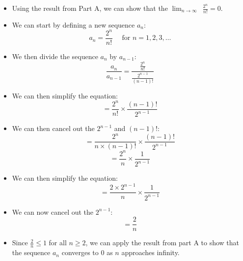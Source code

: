 \documentclass[12pt]{report}
\begin{document}
\begin{enumerate}[leftmargin=\labelsep]
\begin{enumerate}
\begin{tcolorbox}
\begin{itemize}[label={}]
                        \item Using the result from Part A, we can show that the $\displaystyle{\lim_{n \to \infty}}\,\,\, \frac{2^n}{n!}=0$.
                        \item We can start by defining a new sequence $a_n$:
                        \begin{equation*}
                            a_n = \frac{2^n}{n!} \quad \text{ for } n=1,2,3,\dots
                        \end{equation*}
                        \item We then divide the sequence $a_n$ by $a_{n-1}$:
                        \begin{equation*} \frac{a_n}{a_{n-1}} = \frac{\frac{2^n}{n!}}{\frac{2^{n-1}}{(n-1)!}}
                        \end{equation*}
                        \item We can then simplify the equation:
                        \begin{equation*}
                           = \frac{2^n}{n!} \times \frac{(n-1)!}{2^{n-1}}
                        \end{equation*}
                        \item We can then cancel out the $2^{n-1}$ and $(n-1)!$:
                        \begin{equation*}
                            = \frac{2^n}{n \times (n-1)!} \times \frac{(n-1)!}{2^{n-1}}
                        \end{equation*}
                        \begin{equation*}
                            =\frac{2^n}{n} \times \frac{1}{2^{n-1}}
                        \end{equation*}
                        \item We can then simplify the equation:
                        \begin{equation*}
                            =\frac{2 \times 2^{n-1}}{n} \times \frac{1}{2^{n-1}}
                        \end{equation*}
                        \item We can now cancel out the $2^{n-1}$:
                        \begin{equation*}
                            =\frac{2}{n}
                        \end{equation*}
                        \item Since $\frac{2}{n} \leq 1$ for all $n \geq 2$, we can apply the result from part A to show that the sequence $a_n$ converges to 0 as $n$ approaches infinity.

\end{itemize}
\end{tcolorbox}
\end{enumerate}
\end{enumerate}
\end{document}
